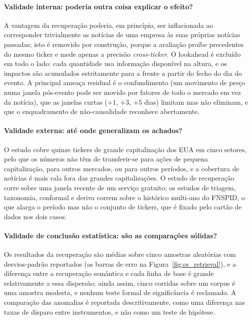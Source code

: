 \paragraph{Validade interna: poderia outra coisa explicar o efeito?} A vantagem da recuperação poderia, em
princípio, ser inflacionada ao corresponder trivialmente as notícias de uma empresa às suas próprias notícias
passadas; isto é removido por construção, porque a avaliação proíbe precedentes do mesmo ticker e mede apenas a
precisão \emph{cross-ticker}. O lookahead é excluído em todo o lado: cada quantidade usa informação disponível
na altura, e os impactos são acumulados estritamente para a frente a partir do fecho do dia do evento. A
principal ameaça residual é o confundimento (um movimento de preço numa janela pós-evento pode ser movido por
fatores de todo o mercado em vez da notícia), que as janelas curtas ($+1$, $+3$, $+5$ dias) limitam mas não
eliminam, e que o enquadramento de não-causalidade reconhece abertamente.

\paragraph{Validade externa: até onde generalizam os achados?} O estudo cobre quinze tickers de grande
capitalização dos EUA em cinco setores, pelo que os números não têm de transferir-se
para ações de pequena capitalização, para outros mercados, ou para outros períodos, e a cobertura de notícias é
mais rala fora das grandes capitalizações. O estudo de recuperação corre sobre uma janela recente de um
serviço gratuito; os estudos de triagem, taxonomia, conformal e deriva correm sobre o
histórico multi-ano do FNSPID, o que alarga o período mas não o conjunto de tickers, que é fixado pelo
cartão de dados nos dois casos.

\paragraph{Validade de conclusão estatística: são as comparações sólidas?} Os resultados da recuperação são
médias sobre cinco amostras aleatórias com desvios-padrão reportados (as barras de erro na
Figura~\ref{fig:cs_retrieval}), e a diferença entre a recuperação semântica e cada linha de base é grande
relativamente a essa dispersão; ainda assim, cinco corridas sobre um corpus é uma amostra modesta, e nenhum
teste formal de significância é reclamado. A comparação das anomalias é reportada descritivamente, como uma
diferença nas taxas de disparo entre instrumentos, e não como um teste de hipótese.

